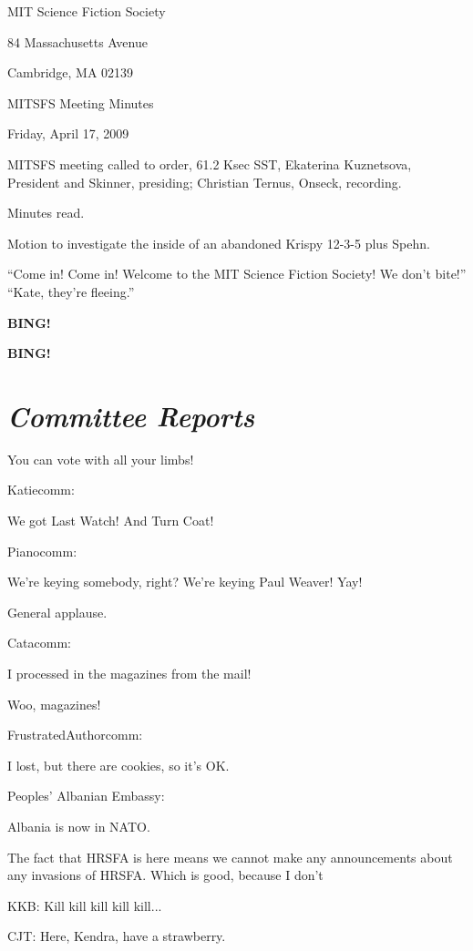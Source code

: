 \documentclass[10pt]{article}
\newcommand{\bing}{{\bf BING!} }
\newcommand{\goto}[1]{\bing \vskip 12pt \section*{{\em{#1}}}}
\newcommand{\ps}{ plus Spehn\xspace}
\begin{document}
\begin{center}

MIT Science Fiction Society

84 Massachusetts Avenue

Cambridge, MA 02139

\vspace{12pt}

MITSFS Meeting Minutes

Friday, April 17, 2009

\end{center}

\vspace{18pt}

\setlength{\parskip}{6pt}

\noindent
MITSFS meeting called to order, 61.2 Ksec SST,
Ekaterina Kuznetsova, President and Skinner, presiding; Christian Ternus, Onseck, recording.

Minutes read.

Motion to investigate the inside of an abandoned Krispy 12-3-5\ps.


``Come in!  Come in!  Welcome to the MIT Science Fiction Society!  We
don't bite!''  ``Kate, they're fleeing.''


\bing


\goto{Committee Reports}

You can vote with all your limbs!

Katiecomm:

We got Last Watch!  And Turn Coat!

Pianocomm:

We're keying somebody, right?  We're keying Paul Weaver!  Yay!

General applause.

Catacomm:

I processed in the magazines from the mail!

Woo, magazines!

FrustratedAuthorcomm:

I lost, but there are cookies, so it's OK.

Peoples' Albanian Embassy:

Albania is now in NATO.

The fact that HRSFA is here means we cannot make any announcements
about any invasions of HRSFA.  Which is good, because I don't 

KKB: Kill kill kill kill kill...

CJT: Here, Kendra, have a strawberry.
\end{document}

